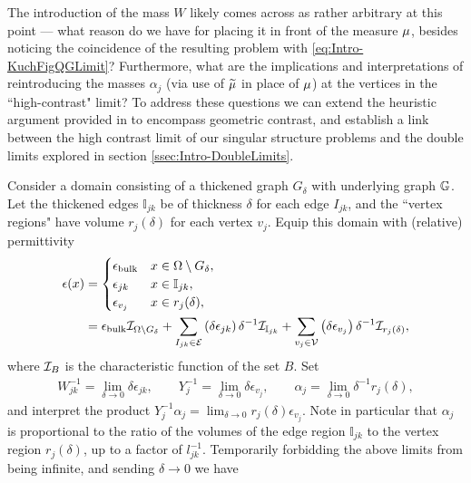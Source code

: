 The introduction of the mass $W$ likely comes across as rather arbitrary at this point --- what reason do we have for placing it in front of the measure $\mu$, besides noticing the coincidence of the resulting problem with \eqref{eq:Intro-KuchFigQGLimit}?
Furthermore, what are the implications and interpretations of reintroducing the masses $\alpha_j$ (via use of $\widetilde{\mu}$ in place of $\mu$) at the vertices in the ``high-contrast" limit?
To address these questions we can extend the heuristic argument provided in \cite{figotin1998spectral} to encompass geometric contrast, and establish a link between the high contrast limit of our singular structure problems and the double limits explored in section \ref{ssec:Intro-DoubleLimits}.

Consider a domain consisting of a thickened graph $G_{\delta}$ with underlying graph $\mathbb{G}$.
Let the thickened edges $\mathbb{I}_{jk}$ be of thickness $\delta$ for each edge $I_{jk}$, and the ``vertex regions" have volume $r_j(\delta)$ for each vertex $v_j$.
Equip this domain with (relative) permittivity
\begin{align*}
	\epsilon(x) &= 
	\begin{cases}
		\epsilon_{\mathrm{bulk}} & x\in\Omega\setminus G_{\delta}, \\
		\epsilon_{jk} & x\in\mathbb{I}_{jk}, \\
		\epsilon_{v_j} & x\in r_j(\delta),
	\end{cases} \\
	&= \epsilon_{\mathrm{bulk}} \mathcal{I}_{\Omega\setminus G_{\delta}}
	+ \sum_{I_{jk}\in\mathcal{E}} \left( \delta\epsilon_{jk} \right) \delta^{-1}\mathcal{I}_{\mathbb{I}_{jk}}
	+ \sum_{v_j\in\mathcal{V}} \left( \delta\epsilon_{v_j} \right) \delta^{-1}\mathcal{I}_{r_j(\delta)},
\end{align*}
where $\mathcal{I}_{B}$ is the characteristic function of the set $B$.
Set 
\begin{align*}
	W_{jk}^{-1} = \lim_{\delta\rightarrow0}\delta\epsilon_{jk}, \qquad
	Y_{j}^{-1} = \lim_{\delta\rightarrow0}\delta\epsilon_{v_j}, \qquad
	\alpha_j = \lim_{\delta\rightarrow0} \delta^{-1}r_j(\delta),
\end{align*}
and interpret the product $Y_{j}^{-1}\alpha_j = \lim_{\delta\rightarrow0} r_j(\delta)\epsilon_{v_j}$.
Note in particular that $\alpha_j$ is proportional to the ratio of the volumes of the edge region $\mathbb{I}_{jk}$ to the vertex region $r_j(\delta)$, up to a factor of $l_{jk}^{-1}$.
Temporarily forbidding the above limits from being infinite, and sending $\delta\rightarrow0$ we have

